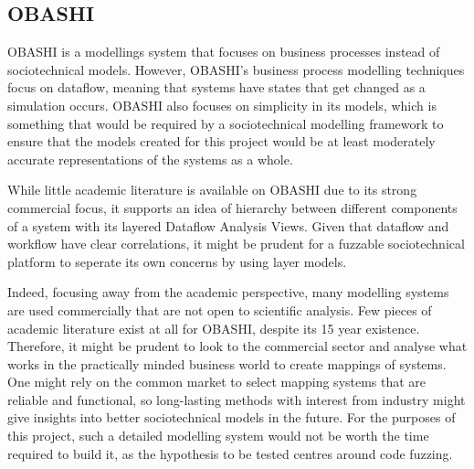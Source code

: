\subsection{OBASHI}
OBASHI\cite{ObashiMethodology} is a modellings system that focuses on business processes instead of sociotechnical models. However, OBASHI's business process modelling techniques focus on dataflow, meaning that systems have states that get changed as a simulation occurs. OBASHI also focuses on simplicity in its models, which is something that would be required by a sociotechnical modelling framework to ensure that the models created for this project would be at least moderately accurate representations of the systems as a whole.\par
While little academic literature is available on OBASHI due to its strong commercial focus, it supports an idea of hierarchy between different components of a system with its layered Dataflow Analysis Views\cite{ObashiMethodology}. Given that dataflow and workflow have clear correlations, it might be prudent for a fuzzable sociotechnical platform to seperate its own concerns by using layer models. \par 
Indeed, focusing away from the academic perspective, many modelling systems are used commercially that are not open to scientific analysis. Few pieces of academic literature exist at all for OBASHI, despite its 15 year existence. Therefore, it might be prudent to look to the commercial sector and analyse what works in the practically minded business world to create mappings of systems. One might rely on the common market to select mapping systems that are reliable and functional, so long-lasting methods with interest from industry might give insights into better sociotechnical models in the future. For the purposes of this project, such a detailed modelling system would not be worth the time required to build it, as the hypothesis to be tested centres around code fuzzing. \par

